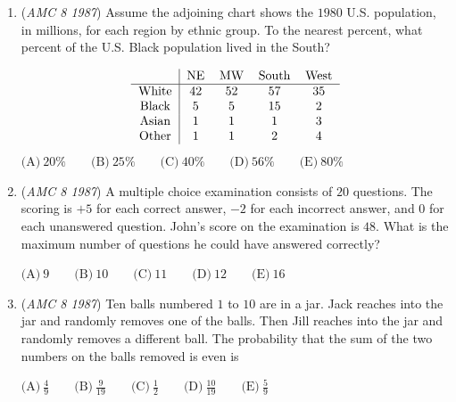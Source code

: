 \begin{enumerate}
$\text{(A)}\ 4\text{ and }5 \qquad \text{(B)}\ 5\text{ and }6 \qquad \text{(C)}\ 6\text{ and }7 \qquad \text{(D)}\ 7\text{ and }8 \qquad \text{(E)}\ 8\text{ and }9$


	\item (\textit{AMC 8 1987}) Assume the adjoining chart shows the $1980$ U.S. population, in millions, for each region by ethnic group.  To the nearest percent, what percent of the U.S. Black population lived in the South?


 
 \[\begin{tabular}[t]{c|cccc}  & NE & MW & South & West \\ \hline White & 42 & 52 & 57 & 35 \\ Black & 5 & 5 & 15 & 2 \\ Asian & 1 & 1 & 1 & 3 \\ Other & 1 & 1 & 2 & 4  \end{tabular}\]
$\text{(A)}\ 20\% \qquad \text{(B)}\ 25\% \qquad \text{(C)}\ 40\% \qquad \text{(D)}\ 56\% \qquad \text{(E)}\ 80\%$


	\item (\textit{AMC 8 1987}) A multiple choice examination consists of $20$ questions.  The scoring is $+5$ for each correct answer, $-2$ for each incorrect answer, and $0$ for each unanswered question.  John's score on the examination is $48$.  What is the maximum number of questions he could have answered correctly?


 $\text{(A)}\ 9 \qquad \text{(B)}\ 10 \qquad \text{(C)}\ 11 \qquad \text{(D)}\ 12 \qquad \text{(E)}\ 16$


	\item (\textit{AMC 8 1987}) Ten balls numbered $1$ to $10$ are in a jar.  Jack reaches into the jar and randomly removes one of the balls.  Then Jill reaches into the jar and randomly removes a different ball.  The probability that the sum of the two numbers on the balls removed is even is


 $\text{(A)}\ \frac{4}{9} \qquad \text{(B)}\ \frac{9}{19} \qquad \text{(C)}\ \frac{1}{2} \qquad \text{(D)}\ \frac{10}{19} \qquad \text{(E)}\ \frac{5}{9}$


\end{enumerate}